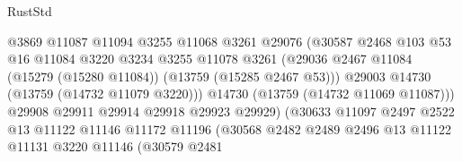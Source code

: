 \begin{lexlean}{RustStd}
\begin{coremodule}
                                        @3869
                                        @11087
                                        @11094
                                        @3255
                                        @11068
                                        @3261
                                        @29076
                                        (@30587
                                          @2468
                                          @103
                                          @53
                                          @16
                                          @11084
                                          @3220
                                          @3234
                                          @3255
                                          @11078
                                          @3261
                                          (@29036
                                            @2467
                                            @11084
                                            (@15279 (@15280 @11084))
                                            (@13759 (@15285 @2467 @53)))
                                          @29003
                                          @14730
                                          (@13759 (@14732 @11079 @3220)))
                                        @14730
                                        (@13759 (@14732 @11069 @11087)))
                                      @29908
                                      @29911
                                      @29914
                                      @29918
                                      @29923
                                      @29929)
                                    (@30633
                                      @11097
                                      @2497
                                      @2522
                                      @13
                                      @11122
                                      @11146
                                      @11172
                                      @11196
                                      (@30568
                                        @2482
                                        @2489
                                        @2496
                                        @13
                                        @11122
                                        @11131
                                        @3220
                                        @11146
                                        (@30579
                                          @2481

\end{coremodule}
\end{lexlean}
